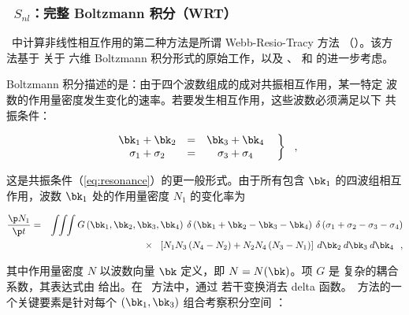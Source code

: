 \vsssub
\subsubsection{~$S_{nl}$：完整 Boltzmann 积分（WRT）} \label{sec:NL2}
\vsssub


\noindent
\ws\ 中计算非线性相互作用的第二种方法是所谓 Webb-Resio-Tracy 方法
（\xnl）。该方法基于 \cite{art:Has62,art:Has63a,art:Has63b} 关于
六维 Boltzmann 积分形式的原始工作，以及 \cite{art:Web78}、
\cite{rep:TR82} 和 \cite{art:RP91} 的进一步考虑。

Boltzmann 积分描述的是：由于四个波数组成的成对共振相互作用，某一特定
波数的作用量密度发生变化的速率。若要发生相互作用，这些波数必须满足以下
共振条件：


\begin{equation} \left .
\begin{array}{ccc}
  \bk_1 + \bk_2 & = & \bk_3 + \bk_4          \\
  \sigma_1 + \sigma_2  & = & \sigma_3 + \sigma_4
\end{array} \:\:\: \right \rbrace \:\:\: , \label{eq:resonance_2}
\end{equation}

\noindent
这是共振条件（\ref{eq:resonance}）的更一般形式。由于所有包含 $\bk_1$
的四波组相互作用，波数 $\bk_1$ 处的作用量密度 $N_1$ 的变化率为

\begin{eqnarray}
\frac{{\p N_1 }}{{\p t}} & = & \int\!\!\int\!\!\int G\left( \bk_1
,\bk_2 ,\bk_3 ,\bk_4 \right ) \: \delta \left( \bk_1  + \bk_2  - \bk_3
- \bk_4 \right)
\: \delta \left( {\sigma _1  + \sigma _2  - \sigma _3  - \sigma _4 }
\right) \nonumber \\  & &
\hspace{7mm}\times \:\:\: \left[ {N_1 N_3 \left( {N_4  - N_2 } \right)
+ N_2 N_4 \left(
{N_3  - N_1 } \right)} \right] \: d\bk_2 \: d\bk_3 \: d\bk_4 \:\:\: ,
\label{eq:HKE}
\end{eqnarray}

\noindent
其中作用量密度 $N$ 以波数向量 $\bk$ 定义，即 $N = N(\bk)$。项 $G$ 是
复杂的耦合系数，其表达式由 \cite{art:HH80} 给出。在 \xnl\ 方法中，通过
若干变换消去 delta 函数。\xnl\ 方法的一个关键要素是针对每个
$(\bk_1 ,\bk_3)$ 组合考察积分空间 \citep[见][]{art:RP91}：

